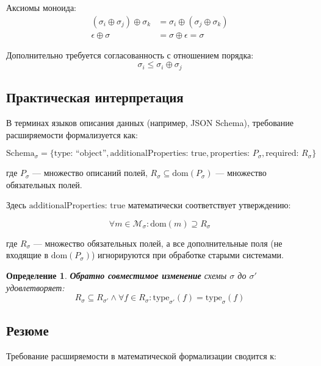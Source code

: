 \documentclass{article}
\newtheorem{definition}{Определение}
\begin{document}
Аксиомы моноида:
\begin{align}
(\sigma_i \oplus \sigma_j) \oplus \sigma_k &= \sigma_i \oplus (\sigma_j \oplus \sigma_k) \\
\epsilon \oplus \sigma &= \sigma \oplus \epsilon = \sigma
\end{align}

Дополнительно требуется согласованность с отношением порядка:
\[
\sigma_i \leq \sigma_i \oplus \sigma_j
\]

\subsection{Практическая интерпретация}

В терминах языков описания данных (например, JSON Schema), требование расширяемости формализуется как:

\[
\text{Schema}_{\sigma} = \{\text{type: ``object''}, \text{additionalProperties: true}, \text{properties: } P_{\sigma}, \text{required: } R_{\sigma}\}
\]

где $P_{\sigma}$ — множество описаний полей, $R_{\sigma} \subseteq \text{dom}(P_{\sigma})$ — множество обязательных полей.

Здесь $\text{additionalProperties: true}$ математически соответствует утверждению:

\[
\forall m \in \mathcal{M}_{\sigma}: \text{dom}(m) \supseteq R_{\sigma}
\]

где $R_{\sigma}$ — множество обязательных полей, а все дополнительные поля (не входящие в $\text{dom}(P_{\sigma})$) игнорируются при обработке старыми системами.

\begin{definition}
\textbf{Обратно совместимое изменение} схемы $\sigma$ до $\sigma'$ удовлетворяет:
\[
R_{\sigma} \subseteq R_{\sigma'} \land \forall f \in R_{\sigma}: \text{type}_{\sigma'}(f) = \text{type}_{\sigma}(f)
\]
\end{definition}

\subsection{Резюме}

Требование расширяемости в математической формализации сводится к:
\end{document}
